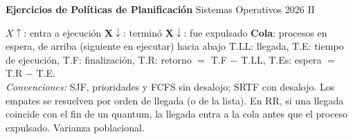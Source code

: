 \documentclass[10pt, a4paper]{article}
\begin{document}
{\Large\textbf{Ejercicios de Políticas de Planificación}} \hfill Sistemas Operativos 2026 II\par\vspace{3pt}
\vspace{2pt}\par\vspace{6pt}
{\footnotesize $X\uparrow$: entra a ejecución \quad
\textcolor{fin}{$\boldsymbol{X\downarrow}$}: terminó \quad
\textcolor{expul}{$\boldsymbol{X\downarrow}$}: fue expulsado \quad
\textbf{Cola}: procesos en espera, de arriba (siguiente en ejecutar) hacia abajo \quad
T.LL: llegada, T.E: tiempo de ejecución, T.F: finalización, T.R: retorno $=$ T.F $-$ T.LL, T.Es: espera $=$ T.R $-$ T.E.\\
\textit{Convenciones:} SJF, prioridades y FCFS sin desalojo; SRTF con desalojo. Los empates se resuelven por orden de llegada (o de la lista). En RR, si una llegada coincide con el fin de un quantum, la llegada entra a la cola antes que el proceso expulsado. Varianza poblacional.}\par\vspace{4pt}
\end{document}
